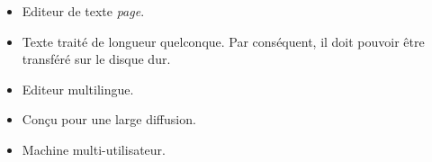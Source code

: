 \begin{itemize}
	\item Editeur de texte \textsl{page}.
	\item Texte traité de longueur quelconque. Par conséquent, il doit pouvoir être transféré sur le disque dur.
	\item Editeur multilingue.
	\item Conçu pour une large diffusion.
	\item Machine multi-utilisateur.
\end{itemize}
